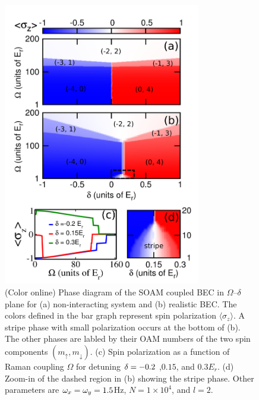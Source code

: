\documentclass[twocolumn,pra,unsortedaddress,showpacs,floatfix,citeautoscript,nofootinbib]{revtex4-1}
\begin{document}
\begin{figure}[t]
\vspace{-0.4cm} \centering
\includegraphics[width=8.6cm]{Fig3.pdf}\vspace{-0.5cm}
\caption{(Color online) Phase diagram of the SOAM coupled BEC in
$\Omega$--$\delta$ plane for (a) non-interacting system and (b)
realistic BEC. The colors defined in the bar graph represent spin
polarization $\langle \sigma_z \rangle$. A stripe phase with small
polarization occurs at the bottom of (b). The other phases are
labled by their OAM numbers of the two spin components
$(m_{\uparrow },m_{\downarrow })$. (c) Spin polarization as a
function of Raman coupling $\Omega $ for detuning $\protect\delta %
=-0.2$ ,$0.15$, and $0.3E_{r}$. (d) Zoom-in of the dashed region
in (b) showing the stripe phase. Other parameters
are $\protect\omega _{x}=\protect\omega _{y}=1.5$Hz, $N=1\times 10^{4}$, and $%
l=2$. } \vspace{-0.8cm}\label{ref_fig3}
\end{figure}
\end{document}
